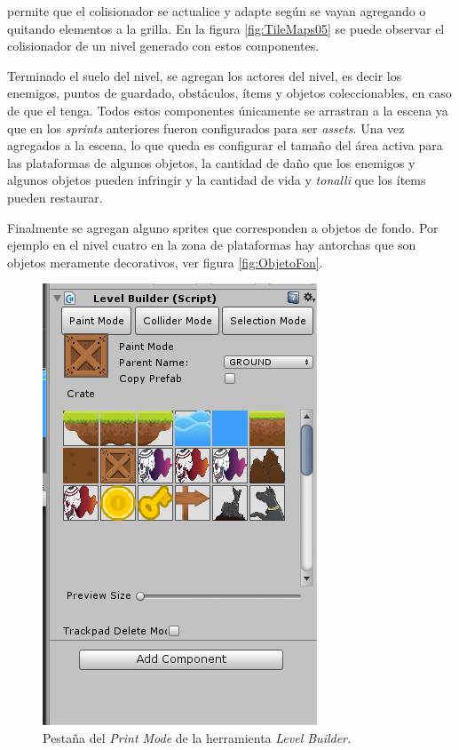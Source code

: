 permite que el colisionador se actualice y adapte según se vayan agregando o
quitando elementos a la grilla. En la figura \ref{fig:TileMaps05} se puede observar
el colisionador de un nivel generado con estos componentes.
\\
\par
Terminado el suelo del nivel, se agregan los actores del nivel, es decir los
enemigos, puntos de guardado, obstáculos, ítems y objetos coleccionables, en
caso de que el tenga. Todos estos componentes únicamente se arrastran a la escena
ya que en los \textit{sprints} anteriores fueron configurados para ser \textit{assets}.
Una vez agregados a la escena, lo que queda es configurar el tamaño del área activa
para las plataformas de algunos objetos, la cantidad de daño que los enemigos y
algunos objetos pueden infringir y la cantidad de vida y \textit{tonalli} que los
ítems pueden restaurar.
\\
\par
Finalmente se agregan alguno sprites que corresponden a objetos de fondo. Por ejemplo
en el nivel cuatro en la zona de plataformas hay antorchas que son objetos meramente
decorativos, ver figura \ref{fig:ObjetoFon}.

\begin{figure}[h]
        \centering
        \includegraphics[height=0.2 \textheight]{03TrabajoRealizado/imagenes/levelBuilder02.png}
        \caption{Pestaña del \textit{Print Mode} de la herramienta \textit{Level
        Builder.}}
        \label{fig:LevelBuilder}
\end{figure}

